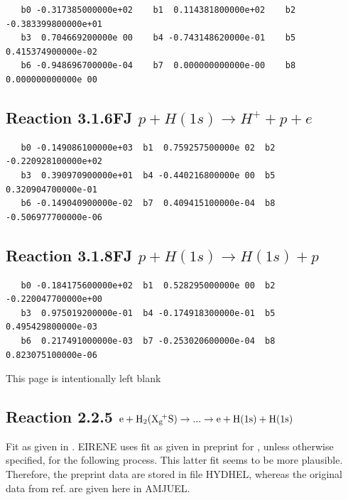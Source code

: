 \documentclass[12pt,dvips]{article}
\begin{document}
\begin{small}\begin{verbatim}
   b0 -0.317385000000e+02    b1  0.114381800000e+02    b2 -0.383399800000e+01
   b3  0.704669200000e 00    b4 -0.743148620000e-01    b5  0.415374900000e-02
   b6 -0.948696700000e-04    b7  0.000000000000e-00    b8  0.000000000000e 00
\end{verbatim}\end{small}

\subsection{
Reaction 3.1.6FJ  $p + H(1s) \rightarrow H^+ + p + e $
}


\begin{small}\begin{verbatim}
   b0 -0.149086100000e+03  b1  0.759257500000e 02  b2 -0.220928100000e+02
   b3  0.390970900000e+01  b4 -0.440216800000e 00  b5  0.320904700000e-01
   b6 -0.149040900000e-02  b7  0.409415100000e-04  b8 -0.506977700000e-06
\end{verbatim}\end{small}

\subsection{
Reaction 3.1.8FJ  $p + H(1s) \rightarrow H(1s) + p  $
}


\begin{small}\begin{verbatim}
   b0 -0.184175600000e+02  b1  0.528295000000e 00  b2 -0.220047700000e+00
   b3  0.975019200000e-01  b4 -0.174918300000e-01  b5  0.495429800000e-03
   b6  0.217491000000e-03  b7 -0.253020600000e-04  b8  0.823075100000e-06
\end{verbatim}\end{small}

\newpage
This page is intentionally left blank
\newpage


\subsection{
Reaction 2.2.5
$\rm e + H_2(X_g\!^+ S ) \rightarrow . . .\rightarrow e + H(1s) + H(1s)$}


Fit as given in \cite{kn:Janev}.
      EIRENE uses fit as given in preprint for \cite{kn:Janev},
      unless otherwise specified, for the following process.
      This latter fit seems to be more plausible. Therefore, the
      preprint data are stored in file HYDHEL, whereas the original
      data from ref.\cite{kn:Janev} are given here in AMJUEL.
\end{document}
